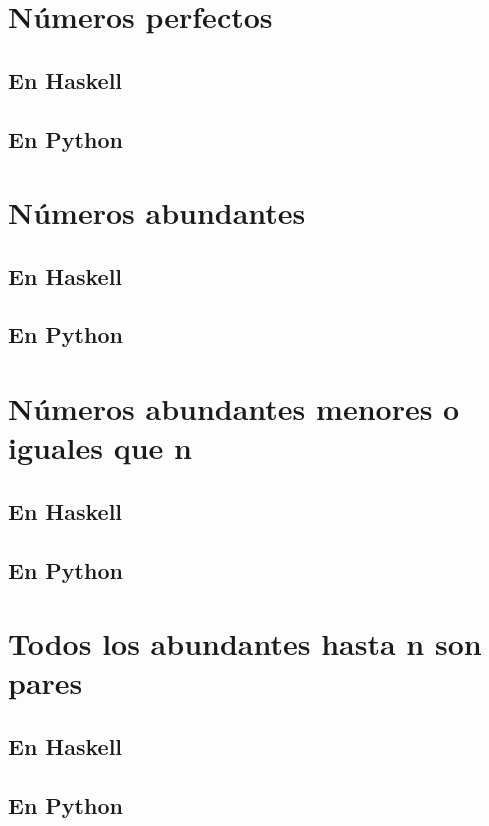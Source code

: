 \documentclass[a4paper,12pt,twoside]{book}
\begin{document}
\section{Números perfectos}
\subsection*{En Haskell}
\subsection*{En Python}

\section{Números abundantes}
\subsection*{En Haskell}
\subsection*{En Python}

\section{Números abundantes menores o iguales que n}
\subsection*{En Haskell}
\subsection*{En Python}

\section{Todos los abundantes hasta n son pares}
\subsection*{En Haskell}
\subsection*{En Python}
\end{document}
